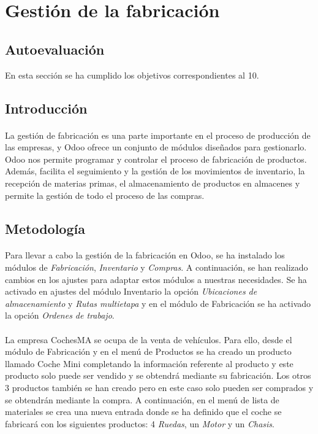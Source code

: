 
\section{Gestión de la fabricación}
\subsection{Autoevaluación}
En esta sección se ha cumplido los objetivos correspondientes al 10.
\subsection{Introducción}
\paragraph{}
La gestión de fabricación es una parte importante en el proceso de producción de las empresas, y Odoo ofrece un conjunto de módulos diseñados para gestionarlo. Odoo nos permite programar y controlar el proceso de fabricación de productos. Además, facilita el seguimiento y la gestión de los movimientos de inventario, la recepción de materias primas, el almacenamiento de productos en almacenes y permite la gestión de todo el proceso de las compras.
\subsection{Metodología}
\paragraph{}
Para llevar a cabo la gestión de la fabricación en Odoo, se ha instalado los módulos de \textit{Fabricación}, \textit{Inventario} y \textit{Compras}. A continuación, se han realizado cambios en los ajustes para adaptar estos módulos a nuestras necesidades. Se ha activado en ajustes del módulo Inventario la opción \textit{Ubicaciones de almacenamiento} y \textit{Rutas multietapa} y en el módulo de Fabricación se ha activado la opción \textit{Ordenes de trabajo}. 
\paragraph{}
La empresa CochesMA se ocupa de la venta de vehículos. Para ello, desde el módulo de Fabricación y en el menú de Productos se ha creado un producto llamado Coche Mini completando la información referente al producto y este producto solo puede ser vendido y se obtendrá mediante su fabricación. Los otros 3 productos también se han creado pero en este caso solo pueden ser comprados y se obtendrán mediante la compra. A continuación, en el menú de lista de materiales se crea una nueva entrada donde se ha definido que el coche se fabricará con los siguientes productos: 4 \textit{Ruedas}, un \textit{Motor} y un \textit{Chasis}. 
